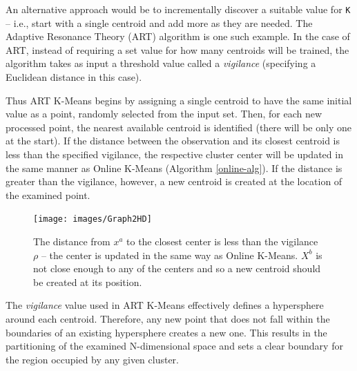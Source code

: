 \documentclass{l4proj}
\begin{document}
An alternative approach would be to incrementally discover a suitable value for \texttt{K} -- i.e., start with a single centroid and add more as they are needed. The Adaptive Resonance Theory (ART) algorithm\cite{ART} is one such example. In the case of ART, instead of requiring a set value for how many centroids will be trained, the algorithm takes as input a threshold value called a \textit{vigilance} (specifying a Euclidean distance in this case). 

Thus ART K-Means begins by assigning a single centroid to have the same initial value as a point, randomly selected from the input set. Then, for each new processed point, the nearest available centroid is identified (there will be only one at the start). If the distance between the observation and its closest centroid is less than the specified vigilance, the respective cluster center will be updated in the same manner as Online K-Means (Algorithm \ref{online-alg}). If the distance is greater than the vigilance, however, a new centroid is created at the location of the examined point.

\begin{figure}[H]
	\centering
    \texttt{[image: images/Graph2HD]}
    \caption{The distance from $x^a$ to the closest center is less than the vigilance $\rho$ -- the center is updated in the same way as Online K-Means. $X^b$ is not close enough to any of the centers and so a new centroid should be created at its position.} 
    \label{artGraph}
\end{figure}

The \textit{vigilance} value used in ART K-Means effectively defines a hypersphere around each centroid. Therefore, any new point that does not fall within the boundaries of an existing hypersphere creates a new one. This results in the partitioning of the examined N-dimensional space and sets a clear boundary for the region occupied by any given cluster. 
\end{document}
